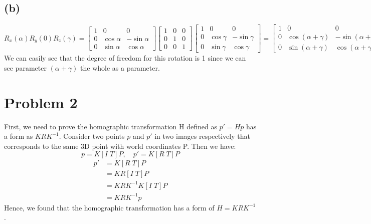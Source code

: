 \documentclass[letterpaper]{article}
\begin{document}
\subsection*{(b)}
$$R_x(\alpha)R_y(0)R_z(\gamma) = 
\begin{bmatrix}
1 & 0 & 0\\
0 & \cos{\alpha} & -\sin{\alpha}\\
0 & \sin{\alpha} & \cos{\alpha}
\end{bmatrix}
\begin{bmatrix}
1 & 0 & 0\\
0 & 1 & 0\\
0 & 0 & 1
\end{bmatrix}
\begin{bmatrix}
1 & 0 & 0\\
0 & \cos{\gamma} & -\sin{\gamma}\\
0 & \sin{\gamma} & \cos{\gamma} 
\end{bmatrix}
= 
\begin{bmatrix}
1 & 0 & 0\\
0 & \cos(\alpha + \gamma) & -\sin(\alpha + \gamma)\\
0 & \sin(\alpha + \gamma) & \cos(\alpha + \gamma) 
\end{bmatrix}
$$
We can easily see that the degree of freedom for this rotation is 1 since we can see parameter $(\alpha + \gamma)$ the whole as a parameter.

\section*{Problem 2}
First, we need to prove the homographic transformation H defined as $p' = Hp$ has a form as $KRK^{-1}$. Consider two points $p$ and $p'$ in two images respectively  that corresponds to the same 3D point with world coordinates P. Then we have:
$$p = K[I\; T]P,\quad p' = K[R\; T]P$$
\begin{align*}
p' & = K[R\; T]P\\
   & = KR[I\; T]P\\
   & = KRK^{-1}K[I\; T]P\\
   & = KRK^{-1}p
\end{align*}
Hence, we found that the homographic transformation has a form of $H = KRK^{-1}$.
\end{document}
